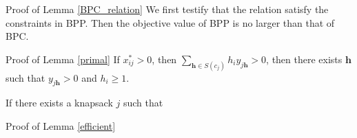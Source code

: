 \begin{pf}{Proof of Lemma \ref{BPC_relation}}
We first testify that the relation satisfy the constraints in BPP. Then the objective value of BPP is no larger than that of BPC.


\end{pf}

\begin{pf}{Proof of Lemma \ref{primal}}
  If $x_{ij}^{*}>0$, then $\sum_{\bm{h} \in S(c_{j})} h_i y_{j \bm{h}} >0$, then there exists $\bm{h}$ such that $y_{j \bm{h}} >0$ and $h_{i} \geq 1$.

  If there exists a knapsack $j$ such that
\end{pf}

\begin{pf}{Proof of Lemma \ref{efficient}}

\end{pf}

\newpage